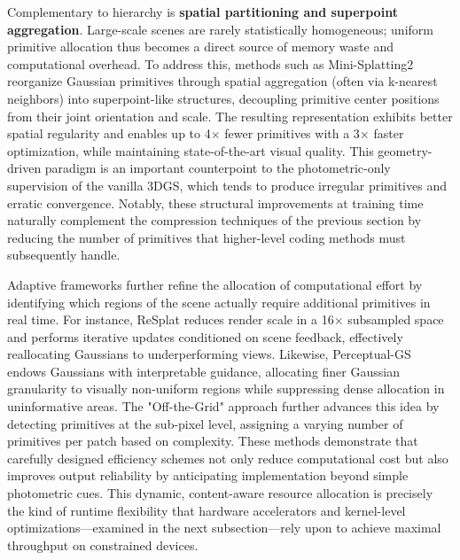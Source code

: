 \documentclass[11pt,a4paper]{article}
\begin{document}
Complementary to hierarchy is \textbf{spatial partitioning and superpoint aggregation}. Large-scale scenes are rarely statistically homogeneous; uniform primitive allocation thus becomes a direct source of memory waste and computational overhead. To address this, methods such as Mini-Splatting2 \cite{arxiv:2411.12788v2} reorganize Gaussian primitives through spatial aggregation (often via k-nearest neighbors) into superpoint-like structures, decoupling primitive center positions from their joint orientation and scale. The resulting representation exhibits better spatial regularity and enables up to 4$\times$ fewer primitives with a 3$\times$ faster optimization, while maintaining state-of-the-art visual quality. This geometry-driven paradigm is an important counterpoint to the photometric-only supervision of the vanilla 3DGS, which tends to produce irregular primitives and erratic convergence. Notably, these structural improvements at training time naturally complement the compression techniques of the previous section by reducing the number of primitives that higher-level coding methods must subsequently handle.

Adaptive frameworks further refine the allocation of computational effort by identifying which regions of the scene actually require additional primitives in real time. For instance, ReSplat \cite{arxiv:2510.08575v3} reduces render scale in a 16$\times$ subsampled space and performs iterative updates conditioned on scene feedback, effectively reallocating Gaussians to underperforming views. Likewise, Perceptual-GS \cite{arxiv:2506.12400v2} endows Gaussians with interpretable guidance, allocating finer Gaussian granularity to visually non-uniform regions while suppressing dense allocation in uninformative areas. The "Off-the-Grid" approach \cite{arxiv:2512.15508v2} further advances this idea by detecting primitives at the sub-pixel level, assigning a varying number of primitives per patch based on complexity. These methods demonstrate that carefully designed efficiency schemes not only reduce computational cost but also improves output reliability by anticipating implementation beyond simple photometric cues. This dynamic, content-aware resource allocation is precisely the kind of runtime flexibility that hardware accelerators and kernel-level optimizations---examined in the next subsection---rely upon to achieve maximal throughput on constrained devices.
\end{document}

